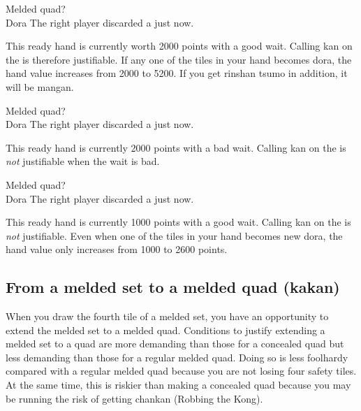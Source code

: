 \bigskip
\begin{itembox}[r]{Melded quad?}
\bp
{}\zhong\zhong\zhong~~~\\
\hspace{310pt}\footnotesize{\jap Dora}
\ep
\vspace{-20pt}The right player discarded a {\large\zhong} just now.
\end{itembox}
\noindent This ready hand is currently worth 2000 points with a good wait. Calling {\jap kan} on the {\large\zhong} is therefore justifiable. If any one of the tiles in your hand becomes {\jap dora}, the hand value increases from 2000 to 5200. If you get {\jap rinshan tsumo} in addition, it will be {\jap mangan}. 

\bigskip
\begin{itembox}[r]{Melded quad?}
\bp
{}\zhong\zhong\zhong~~~\\
\hspace{310pt}\footnotesize{\jap Dora}
\ep
\vspace{-20pt}The right player discarded a {\large\zhong} just now.
\end{itembox}
\noindent This ready hand is currently 2000 points with a bad wait. Calling {\jap kan} on the {\large\zhong} is \emph{not} justifiable when the wait is bad.

\bigskip
\begin{itembox}[r]{Melded quad?}
\bp
{}\zhong\zhong\zhong~~~\\
\hspace{310pt}\footnotesize{\jap Dora}
\ep
\vspace{-20pt}The right player discarded a {\large\zhong} just now.
\end{itembox}
\noindent This ready hand is currently 1000 points with a good wait. Calling {\jap kan} on the {\large\zhong} is \emph{not} justifiable. Even when one of the tiles in your hand becomes new {\jap dora}, the hand value only increases from 1000 to 2600 points. 

\subsection{From a melded set to a melded quad ({\jap kakan})}
When you draw the fourth tile of a melded set, you have an opportunity to extend the melded set to a melded quad. Conditions to justify extending a melded set to a quad are more demanding than those for a concealed quad but less demanding than those for a regular melded quad. 
Doing so is less foolhardy compared with a regular melded quad because you are not losing four safety tiles. At the same time, this is riskier than making a concealed quad because you may be running the risk of getting {\jap chankan} (Robbing the Kong). 

